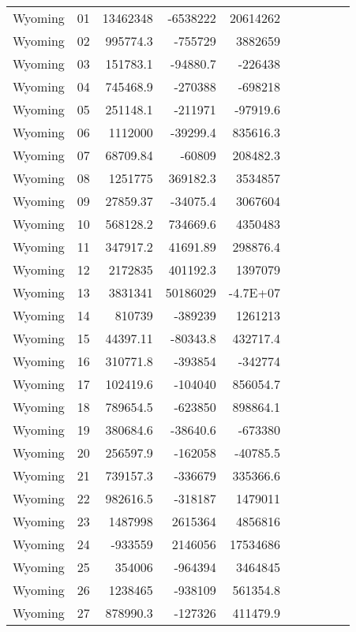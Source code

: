 \begin{landscape}
\begin{singlespace}
\begin{longtable}{lrrrr|lrrrr}
		Wyoming &  01 & 13462348 & -6538222 & 20614262 &&&&& \\
		Wyoming &  02 & 995774.3 & -755729 & 3882659 &&&&& \\
		Wyoming &  03 & 151783.1 & -94880.7 & -226438  &&&&& \\
		Wyoming &  04 & 745468.9 & -270388 & -698218 &&&&& \\
		Wyoming &  05 & 251148.1 & -211971 & -97919.6 &&&&& \\
		Wyoming &  06 & 1112000 & -39299.4 & 835616.3 &&&&& \\
		Wyoming &  07 & 68709.84 & -60809 & 208482.3 &&&&& \\
		Wyoming &  08 & 1251775 & 369182.3 & 3534857 &&&&& \\
		Wyoming &  09 & 27859.37 & -34075.4 & 3067604 &&&&& \\
		Wyoming &  10 & 568128.2 & 734669.6 & 4350483 &&&&& \\
		Wyoming &  11 & 347917.2 & 41691.89 & 298876.4 &&&&& \\
		Wyoming &  12 & 2172835 & 401192.3 & 1397079 &&&&& \\
		Wyoming &  13 & 3831341 & 50186029 & -4.7E+07 &&&&& \\
		Wyoming &  14 & 810739 & -389239 & 1261213 &&&&& \\
		Wyoming &  15 & 44397.11 & -80343.8 & 432717.4 &&&&& \\
		Wyoming &  16 & 310771.8 & -393854 & -342774 &&&&& \\
		Wyoming &  17 & 102419.6 & -104040 & 856054.7 &&&&& \\
		Wyoming &  18 & 789654.5 & -623850 & 898864.1 &&&&& \\
		Wyoming &  19 & 380684.6 & -38640.6 & -673380 &&&&& \\
		Wyoming &  20 & 256597.9 & -162058 & -40785.5 &&&&& \\
		Wyoming &  21 & 739157.3 & -336679 & 335366.6 &&&&& \\
		Wyoming &  22 & 982616.5 & -318187 & 1479011 &&&&& \\
		Wyoming &  23 & 1487998 & 2615364 & 4856816 &&&&& \\
		Wyoming &  24 & -933559 & 2146056 & 17534686 &&&&& \\
		Wyoming &  25 & 354006 & -964394 & 3464845 &&&&& \\
		Wyoming &  26 & 1238465 & -938109 & 561354.8 &&&&& \\
		Wyoming &  27 & 878990.3 & -127326 & 411479.9 & &&&& \\

\end{longtable}
\end{singlespace}
\end{landscape}

